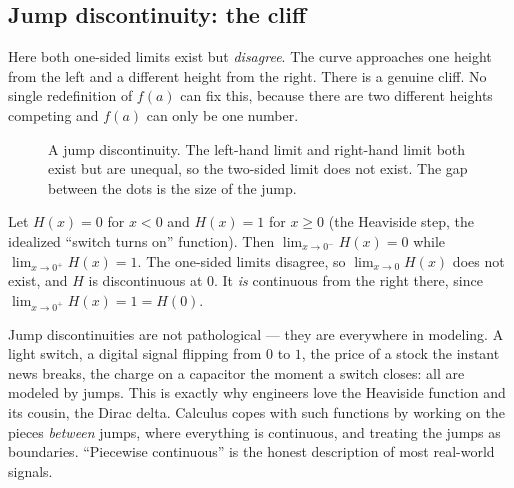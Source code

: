 \subsection{Jump discontinuity: the cliff}

Here both one-sided limits exist but \emph{disagree}. The curve approaches one height from
the left and a different height from the right. There is a genuine cliff. No single
redefinition of $f(a)$ can fix this, because there are two different heights competing and
$f(a)$ can only be one number.

\begin{figure}[H]
\centering
{}
\caption{A jump discontinuity. The left-hand limit and right-hand limit both exist but
are unequal, so the two-sided limit does not exist. The gap between the dots is the size
of the jump.}
\label{ch08:fig-jump}
\end{figure}

\begin{example}
\label{ch08:ex-step}
Let $H(x)=0$ for $x<0$ and $H(x)=1$ for $x\ge 0$ (the Heaviside step, the idealized
``switch turns on'' function). Then $\lim_{x\to 0^-}H(x)=0$ while $\lim_{x\to 0^+}H(x)=1$.
The one-sided limits disagree, so $\lim_{x\to 0}H(x)$ does not exist, and $H$ is
discontinuous at $0$. It \emph{is} continuous from the right there, since
$\lim_{x\to 0^+}H(x)=1=H(0)$.
\end{example}

\begin{applicationbox}
Jump discontinuities are not pathological --- they are everywhere in modeling. A light
switch, a digital signal flipping from $0$ to $1$, the price of a stock the instant news
breaks, the charge on a capacitor the moment a switch closes: all are modeled by jumps.
This is exactly why engineers love the Heaviside function and its cousin, the Dirac delta.
Calculus copes with such functions by working on the pieces \emph{between} jumps, where
everything is continuous, and treating the jumps as boundaries. ``Piecewise continuous''
is the honest description of most real-world signals.
\end{applicationbox}

